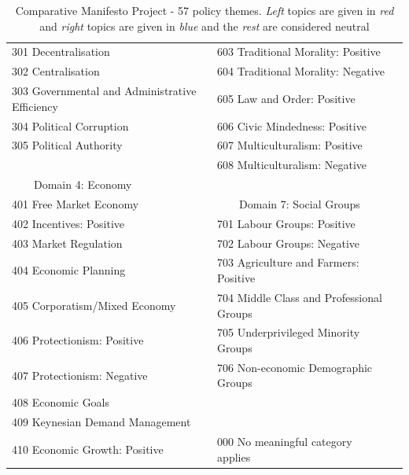 \documentclass[11pt,a4paper]{article}
\newcommand{\tabitem}{~~\llap{\textbullet}~~}
\begin{document}
\begin{small}
\begin{table}
\begin{tabular}{lll}
\\
  301 Decentralisation & \color{blue}  603 Traditional Morality: Positive
\\
  302 Centralisation &   604 Traditional Morality: Negative
\\
  303 Governmental and Administrative Efficiency &  \color{blue}  605 Law and Order: Positive
\\
  304 Political Corruption &  \color{blue} 606 Civic Mindedness: Positive
\\
  \color{blue} 305 Political Authority &   607 Multiculturalism: Positive
\\
&   608 Multiculturalism: Negative\\
\tabitem Domain 4: Economy  & \\
 \color{blue} 401 Free Market Economy & \tabitem Domain 7: Social Groups\\
 \color{blue} 402 Incentives: Positive & \color{red} 701 Labour Groups: Positive\\
\color{red}  403 Market Regulation & 702 Labour Groups: Negative\\
\color{red}  404 Economic Planning & 703 Agriculture and Farmers: Positive\\
  405 Corporatism/Mixed Economy & 704 Middle Class and Professional Groups\\
\color{red}  406 Protectionism: Positive & 705 Underprivileged Minority Groups\\
\color{blue}  407 Protectionism: Negative & 706 Non-economic Demographic Groups\\
  408 Economic Goals & \\
  409 Keynesian Demand Management & \\
  410 Economic Growth: Positive & 000 No meaningful category applies\\
    \bottomrule   
  \end{tabular}
  \caption{Comparative Manifesto Project - 57 policy themes. \textit{Left} topics are given in \textit{\color{red}red} and \textit{right} topics are given in \textit{\color{blue}blue} and the \textit{\color{black}rest} are considered neutral}
  \label{fig:CMP}
\end{table}
\end{small}
\end{document}

